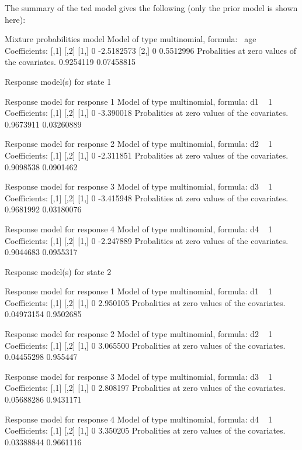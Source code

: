 \documentclass[article]{jss}
\begin{document}
The summary of the ted model gives the following (only the
prior model is shown here):
\begin{Schunk}
\begin{Soutput}
Mixture probabilities model 
Model of type multinomial, formula: ~age
Coefficients: 
     [,1]       [,2]
[1,]    0 -2.5182573
[2,]    0  0.5512996
Probalities at zero values of the covariates.
0.9254119 0.07458815 

Response model(s) for state 1 

Response model for response 1 
Model of type multinomial, formula: d1 ~ 1
Coefficients: 
     [,1]      [,2]
[1,]    0 -3.390018
Probalities at zero values of the covariates.
0.9673911 0.03260889 

Response model for response 2 
Model of type multinomial, formula: d2 ~ 1
Coefficients: 
     [,1]      [,2]
[1,]    0 -2.311851
Probalities at zero values of the covariates.
0.9098538 0.0901462 

Response model for response 3 
Model of type multinomial, formula: d3 ~ 1
Coefficients: 
     [,1]      [,2]
[1,]    0 -3.415948
Probalities at zero values of the covariates.
0.9681992 0.03180076 

Response model for response 4 
Model of type multinomial, formula: d4 ~ 1
Coefficients: 
     [,1]      [,2]
[1,]    0 -2.247889
Probalities at zero values of the covariates.
0.9044683 0.0955317 


Response model(s) for state 2 

Response model for response 1 
Model of type multinomial, formula: d1 ~ 1
Coefficients: 
     [,1]     [,2]
[1,]    0 2.950105
Probalities at zero values of the covariates.
0.04973154 0.9502685 

Response model for response 2 
Model of type multinomial, formula: d2 ~ 1
Coefficients: 
     [,1]     [,2]
[1,]    0 3.065500
Probalities at zero values of the covariates.
0.04455298 0.955447 

Response model for response 3 
Model of type multinomial, formula: d3 ~ 1
Coefficients: 
     [,1]     [,2]
[1,]    0 2.808197
Probalities at zero values of the covariates.
0.05688286 0.9431171 

Response model for response 4 
Model of type multinomial, formula: d4 ~ 1
Coefficients: 
     [,1]     [,2]
[1,]    0 3.350205
Probalities at zero values of the covariates.
0.03388844 0.9661116 
\end{Soutput}
\end{Schunk}
\end{document}
